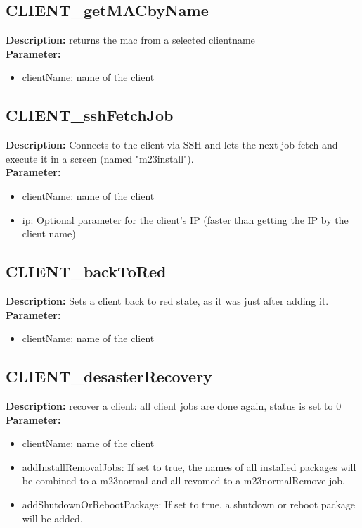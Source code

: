 \subsection{CLIENT\_getMACbyName}
\textbf{Description:} returns the mac from a selected clientname\\
\textbf{Parameter:}
\begin{itemize}
\item clientName: name of the client
\end{itemize}

\subsection{CLIENT\_sshFetchJob}
\textbf{Description:} Connects to the client via SSH and lets the next job fetch and execute it in a screen (named "m23install").\\
\textbf{Parameter:}
\begin{itemize}
\item clientName: name of the client
\item ip: Optional parameter for the client's IP (faster than getting the IP by the client name)
\end{itemize}

\subsection{CLIENT\_backToRed}
\textbf{Description:} Sets a client back to red state, as it was just after adding it.\\
\textbf{Parameter:}
\begin{itemize}
\item clientName: name of the client
\end{itemize}

\subsection{CLIENT\_desasterRecovery}
\textbf{Description:} recover a client: all client jobs are done again, status is set to 0\\
\textbf{Parameter:}
\begin{itemize}
\item clientName: name of the client
\item addInstallRemovalJobs: If set to true, the names of all installed packages will be combined to a m23normal and all revomed to a m23normalRemove job.
\item addShutdownOrRebootPackage: If set to true, a shutdown or reboot package will be added.
\end{itemize}

